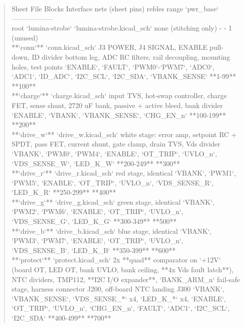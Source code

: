 \documentclass[11pt,a4paper]{article}
\begin{document}
\begin{quote}\small\ttfamily\raggedright
\textbar{} Sheet \textbar{} File \textbar{} Blocks \textbar{} Interface nets (sheet pins) \textbar{} refdes range \textbar{} `pwr\_base` \textbar{}\\
\textbar{}---\textbar{}---\textbar{}---\textbar{}---\textbar{}---\textbar{}---\textbar{}\\
\textbar{} root `lumina-strobe` \textbar{} `lumina-strobe.kicad\_sch` \textbar{} none (stitching only) \textbar{} - \textbar{} - \textbar{} 1 (unused) \textbar{}\\
\textbar{} {*}{*}`conn`{*}{*} \textbar{} `conn.kicad\_sch` \textbar{} J3 POWER, J4 SIGNAL, ENABLE pull-down, ID divider bottom leg, ADC RC filters, rail decoupling, mounting holes, test points \textbar{} `ENABLE`, `FAULT`, `PWM0`-`PWM7`, `ADC0`, `ADC1`, `ID\_ADC`, `I2C\_SCL`, `I2C\_SDA`, `VBANK\_SENSE` \textbar{} {*}{*}1-99{*}{*} \textbar{} {*}{*}100{*}{*} \textbar{}\\
\textbar{} {*}{*}`charge`{*}{*} \textbar{} `charge.kicad\_sch` \textbar{} input TVS, hot-swap controller, charge FET, sense shunt, 2720 uF bank, passive + active bleed, bank divider \textbar{} `ENABLE`, `VBANK`, `VBANK\_SENSE`, `CHG\_EN\_n` \textbar{} {*}{*}100-199{*}{*} \textbar{} {*}{*}200{*}{*} \textbar{}\\
\textbar{} {*}{*}`drive\_w`{*}{*} \textbar{} `drive\_w.kicad\_sch` \textbar{} white stage: error amp, setpoint RC + SPDT, pass FET, current shunt, gate clamp, drain TVS, Vds divider \textbar{} `VBANK`, `PWM0`, `PWM4`, `ENABLE`, `OT\_TRIP`, `UVLO\_n`, `VDS\_SENSE\_W`, `LED\_K\_W` \textbar{} {*}{*}200-249{*}{*} \textbar{} {*}{*}300{*}{*} \textbar{}\\
\textbar{} {*}{*}`drive\_r`{*}{*} \textbar{} `drive\_r.kicad\_sch` \textbar{} red stage, identical \textbar{} `VBANK`, `PWM1`, `PWM5`, `ENABLE`, `OT\_TRIP`, `UVLO\_n`, `VDS\_SENSE\_R`, `LED\_K\_R` \textbar{} {*}{*}250-299{*}{*} \textbar{} {*}{*}400{*}{*} \textbar{}\\
\textbar{} {*}{*}`drive\_g`{*}{*} \textbar{} `drive\_g.kicad\_sch` \textbar{} green stage, identical \textbar{} `VBANK`, `PWM2`, `PWM6`, `ENABLE`, `OT\_TRIP`, `UVLO\_n`, `VDS\_SENSE\_G`, `LED\_K\_G` \textbar{} {*}{*}300-349{*}{*} \textbar{} {*}{*}500{*}{*} \textbar{}\\
\textbar{} {*}{*}`drive\_b`{*}{*} \textbar{} `drive\_b.kicad\_sch` \textbar{} blue stage, identical \textbar{} `VBANK`, `PWM3`, `PWM7`, `ENABLE`, `OT\_TRIP`, `UVLO\_n`, `VDS\_SENSE\_B`, `LED\_K\_B` \textbar{} {*}{*}350-399{*}{*} \textbar{} {*}{*}600{*}{*} \textbar{}\\
\textbar{} {*}{*}`protect`{*}{*} \textbar{} `protect.kicad\_sch` \textbar{} 2x {*}{*}quad{*}{*} comparator on `+12V` (board OT, LED OT, bank UVLO, bank ceiling, {*}{*}4x Vds fault latch{*}{*}), NTC dividers, TMP112, {*}{*}I2C I/O expander{*}{*}, `BANK\_ARM\_n` fail-safe stage, harness connector J200, off-board NTC landing J300 \textbar{} `VBANK`, `VBANK\_SENSE`, `VDS\_SENSE\_{*}` x4, `LED\_K\_{*}` x4, `ENABLE`, `OT\_TRIP`, `UVLO\_n`, `CHG\_EN\_n`, `FAULT`, `ADC1`, `I2C\_SCL`, `I2C\_SDA` \textbar{} {*}{*}400-499{*}{*} \textbar{} {*}{*}700{*}{*} \textbar{}
\end{quote}
\end{document}

